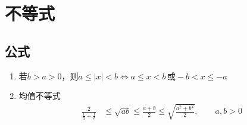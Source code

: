 \documentclass[../book.tex]{subfiles}
\begin{document}



    \section{不等式}

    \subsection{公式}

    \begin{enumerate}
        \item 若$b > a > 0$，则$a \leq |x| < b \Leftrightarrow a \leq x < b \,\text{或}-b < x \leq -a$
        \item 均值不等式
        \[
            \begin{aligned}
                \frac{2}{\displaystyle\frac{1}{a}+\displaystyle\frac{1}{b}}
                &\le \sqrt{ab}
                \le \frac{a+b}{2}
                \le \sqrt{\frac{a^2+b^2}{2}},
                \qquad a,b>0
            \end{aligned}
        \]


\end{enumerate}
\end{document}
